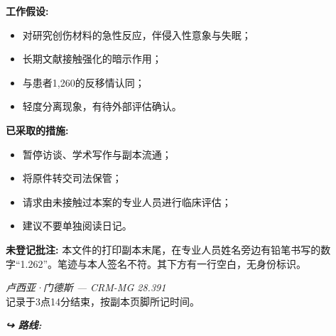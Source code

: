 \noindent \textbf{工作假设:}

\begin{itemize}
\item 对研究创伤材料的急性反应，伴侵入性意象与失眠；
\item 长期文献接触强化的暗示作用；
\item 与患者1,260的反移情认同；
\item 轻度分离现象，有待外部评估确认。
\end{itemize}

\noindent \textbf{已采取的措施:}

\begin{itemize}
\item 暂停访谈、学术写作与副本流通；
\item 将原件转交司法保管；
\item 请求由未接触过本案的专业人员进行临床评估；
\item 建议不要单独阅读日记。
\end{itemize}

\noindent \textbf{未登记批注:}
\noindent 本文件的打印副本末尾，在专业人员姓名旁边有铅笔书写的数字“1.262”。笔迹与本人签名不符。其下方有一行空白，无身份标识。

\noindent \textit{卢西亚·门德斯 --- CRM-MG 28.391}\\
\noindent 记录于3点14分结束，按副本页脚所记时间。

\vspace{0.5em}
\noindent\textit{\textbf{↪ 路线:}  \rotasep {} \rotasep {}}

